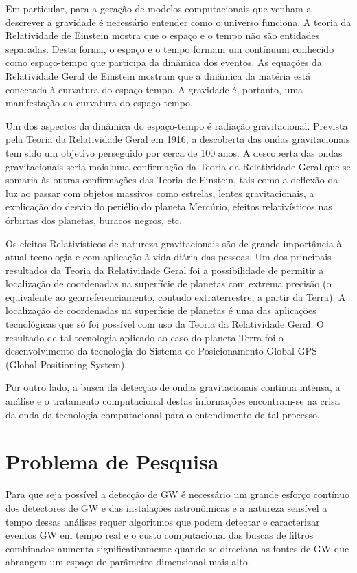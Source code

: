 Em particular, para a geração de modelos computacionais que venham a descrever a gravidade é necessário entender como o universo funciona. A teoria da Relatividade de Einstein \cite{albert1920realtivity} mostra que o espaço e o tempo não são entidades separadas. Desta forma, o espaço e o tempo formam um contínuum conhecido como espaço-tempo que participa da dinâmica dos eventos. As equações da Relatividade Geral de Einstein mostram que a dinâmica da matéria está conectada à curvatura do espaço-tempo. A gravidade é, portanto, uma manifestação da curvatura do espaço-tempo.

Um dos aspectos da dinâmica do espaço-tempo é radiação gravitacional. Prevista pela Teoria da Relatividade Geral em 1916, a descoberta das ondas gravitacionais tem sido um objetivo perseguido por cerca de 100 anos. A descoberta das ondas gravitacionais seria mais uma confirmação da Teoria da Relatividade Geral que se somaria às outras confirmações das Teoria de Einstein, tais como a deflexão da luz ao passar com objetos massivos como estrelas, lentes gravitacionais, a explicação do desvio do periélio do planeta Mercúrio, efeitos relativísticos nas órbirtas dos planetas, buracos negros, etc. 

Os efeitos Relativísticos de natureza gravitacionais são de grande importância à atual tecnologia e com aplicação à vida diária das pessoas. Um dos principais resultados da Teoria da Relatividade Geral foi a possibilidade de permitir a localização de coordenadas na superfície de planetas com extrema precisão (o equivalente ao georreferenciamento, contudo extraterrestre, a partir da Terra). A localização de coordenadas na superfície de planetas é uma das aplicações tecnológicas que só foi possível com uso da Teoria da Relatividade Geral. O resultado de tal tecnologia aplicado ao caso do planeta Terra foi o desenvolvimento da tecnologia do Sistema de Posicionamento Global GPS (Global Positioning System).

Por outro lado, a busca da detecção de ondas gravitacionais continua intensa, a análise e o tratamento computacional destas informações encontram-se na crisa da onda da tecnologia computacional para o entendimento de tal processo.

\section{Problema de Pesquisa}
Para que seja possível a detecção de GW é necessário um grande esforço contínuo dos detectores de GW e das instalações astronômicas e a natureza sensível a tempo dessas análises requer algoritmos que podem detectar e caracterizar eventos GW em tempo real e o custo computacional das buscas de filtros combinados aumenta significativamente quando se direciona as fontes de GW que abrangem um espaço de parâmetro dimensional mais alto.

